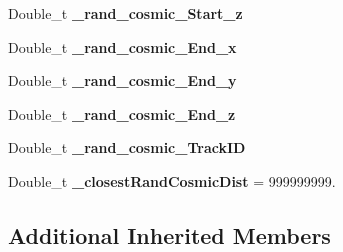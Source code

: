 \begin{DoxyCompactItemize}
\item 
\hypertarget{classselection_1_1CRTApproachSelection_ac01829671455b1c595e944b00b2cfde4}{Double\-\_\-t {\bfseries \-\_\-rand\-\_\-cosmic\-\_\-\-Start\-\_\-z}}\label{classselection_1_1CRTApproachSelection_ac01829671455b1c595e944b00b2cfde4}

\item 
\hypertarget{classselection_1_1CRTApproachSelection_abc2bb317bd856e749c2395407b4293f5}{Double\-\_\-t {\bfseries \-\_\-rand\-\_\-cosmic\-\_\-\-End\-\_\-x}}\label{classselection_1_1CRTApproachSelection_abc2bb317bd856e749c2395407b4293f5}

\item 
\hypertarget{classselection_1_1CRTApproachSelection_afe50ea2e4b51e72832e952836989c833}{Double\-\_\-t {\bfseries \-\_\-rand\-\_\-cosmic\-\_\-\-End\-\_\-y}}\label{classselection_1_1CRTApproachSelection_afe50ea2e4b51e72832e952836989c833}

\item 
\hypertarget{classselection_1_1CRTApproachSelection_aa7e0dd80764787acb3a4201f17f731eb}{Double\-\_\-t {\bfseries \-\_\-rand\-\_\-cosmic\-\_\-\-End\-\_\-z}}\label{classselection_1_1CRTApproachSelection_aa7e0dd80764787acb3a4201f17f731eb}

\item 
\hypertarget{classselection_1_1CRTApproachSelection_ad0c733ea5c72da5dadc0305ffc8c76d0}{Double\-\_\-t {\bfseries \-\_\-rand\-\_\-cosmic\-\_\-\-Track\-I\-D}}\label{classselection_1_1CRTApproachSelection_ad0c733ea5c72da5dadc0305ffc8c76d0}

\item 
\hypertarget{classselection_1_1CRTApproachSelection_af6412c820768d9db1ee2ad8c699f0d4f}{Double\-\_\-t {\bfseries \-\_\-closest\-Rand\-Cosmic\-Dist} = 999999999.}\label{classselection_1_1CRTApproachSelection_af6412c820768d9db1ee2ad8c699f0d4f}

\end{DoxyCompactItemize}
\subsection*{Additional Inherited Members}


